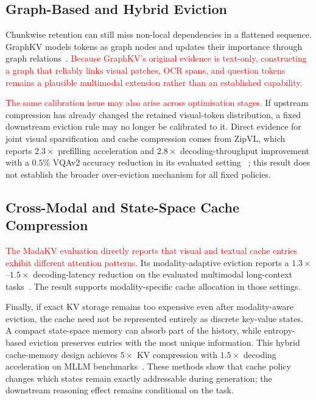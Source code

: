 \documentclass[10pt]{article}
\begin{document}
\subsection{Graph-Based and Hybrid Eviction}

Chunkwise retention can still miss non-local dependencies in a flattened sequence.
GraphKV models tokens as graph nodes and updates their importance through graph
relations~\citep{li2025graphkvbreakingstaticselection}.
\textcolor{red}{Because GraphKV's original evidence is text-only, constructing a graph
that reliably links visual patches, OCR spans, and question tokens remains a plausible
multimodal extension rather than an established capability.}

\textcolor{red}{The same calibration issue may also arise across optimisation stages.}
If upstream compression has already changed the retained visual-token distribution, a
fixed downstream eviction rule may no longer be calibrated to it.  Direct evidence for
joint visual sparsification and cache compression comes from ZipVL, which reports
$2.3\!\times$ prefilling acceleration and $2.8\!\times$ decoding-throughput improvement
with a $0.5\%$ VQAv2 accuracy reduction in its evaluated setting
~\citep{he2024zipvlefficientlargevisionlanguage}; this result does not establish the
broader over-eviction mechanism for all fixed policies.

\subsection{Cross-Modal and State-Space Cache Compression}

\textcolor{red}{The MadaKV evaluation directly reports that visual and textual cache
entries exhibit different attention patterns.}  Its modality-adaptive eviction reports a
$1.3\!\times$--$1.5\!\times$ decoding-latency reduction on the evaluated multimodal
long-context tasks~\citep{li2025madakvadaptivemodalityperceptionkv}.  The result supports
modality-specific cache allocation in those settings.

Finally, if exact KV storage remains too expensive even after modality-aware eviction,
the cache need not be represented entirely as discrete key-value states.  A compact
state-space memory can absorb part of the history, while entropy-based eviction
preserves entries with the most unique information.  This hybrid cache-memory design
achieves $5\!\times$ KV compression with $1.5\!\times$ decoding acceleration on MLLM
benchmarks~\citep{liu2026retentivekvstatespacememoryuncertaintyaware}.  These methods
show that cache policy changes which states remain exactly addressable during
generation; the downstream reasoning effect remains conditional on the task.
\end{document}
